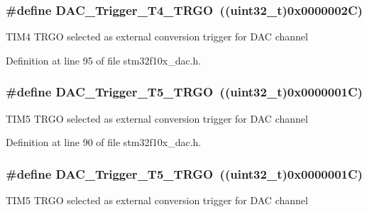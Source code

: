 \subsubsection[{\texorpdfstring{D\+A\+C\+\_\+\+Trigger\+\_\+\+T4\+\_\+\+T\+R\+GO}{DAC_Trigger_T4_TRGO}}]{\setlength{\rightskip}{0pt plus 5cm}\#define D\+A\+C\+\_\+\+Trigger\+\_\+\+T4\+\_\+\+T\+R\+GO~(({\bf uint32\+\_\+t})0x0000002\+C)}\hypertarget{group___d_a_c__trigger__selection_ga58ccb2de3d22d66ee975152f5edb330a}{}\label{group___d_a_c__trigger__selection_ga58ccb2de3d22d66ee975152f5edb330a}
T\+I\+M4 T\+R\+GO selected as external conversion trigger for D\+AC channel 

Definition at line 95 of file stm32f10x\+\_\+dac.\+h.

\subsubsection[{\texorpdfstring{D\+A\+C\+\_\+\+Trigger\+\_\+\+T5\+\_\+\+T\+R\+GO}{DAC_Trigger_T5_TRGO}}]{\setlength{\rightskip}{0pt plus 5cm}\#define D\+A\+C\+\_\+\+Trigger\+\_\+\+T5\+\_\+\+T\+R\+GO~(({\bf uint32\+\_\+t})0x0000001\+C)}\hypertarget{group___d_a_c__trigger__selection_ga35352cebfd1ae8a3d63e374a5d86a85d}{}\label{group___d_a_c__trigger__selection_ga35352cebfd1ae8a3d63e374a5d86a85d}
T\+I\+M5 T\+R\+GO selected as external conversion trigger for D\+AC channel 

Definition at line 90 of file stm32f10x\+\_\+dac.\+h.

\subsubsection[{\texorpdfstring{D\+A\+C\+\_\+\+Trigger\+\_\+\+T5\+\_\+\+T\+R\+GO}{DAC_Trigger_T5_TRGO}}]{\setlength{\rightskip}{0pt plus 5cm}\#define D\+A\+C\+\_\+\+Trigger\+\_\+\+T5\+\_\+\+T\+R\+GO~(({\bf uint32\+\_\+t})0x0000001\+C)}\hypertarget{group___d_a_c__trigger__selection_ga35352cebfd1ae8a3d63e374a5d86a85d}{}\label{group___d_a_c__trigger__selection_ga35352cebfd1ae8a3d63e374a5d86a85d}
T\+I\+M5 T\+R\+GO selected as external conversion trigger for D\+AC channel 

